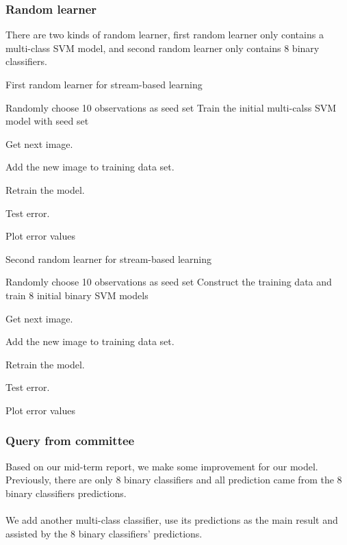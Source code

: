 \documentclass{article}
\begin{document}
\subsubsection{Random learner}
There are two kinds of random learner, first random learner only contains a multi-class SVM model, and second random learner only contains 8 binary classifiers.
\begin{algorithm}[H]
	\caption{First random learner for stream-based learning}
	\begin{algorithmic}
		\State Randomly choose 10 observations as seed set
		\State Train the initial multi-calss SVM model with seed set

			Get next image.
			
			Add the new image to training data set.
			
			Retrain the model.
			
			Test error.
		\EndFor
		
	\State Plot error values
	\end{algorithmic}
\end{algorithm}

\begin{algorithm}[H]
	\caption{Second random learner for stream-based learning}
	\begin{algorithmic}
		\State Randomly choose 10 observations as seed set
		\State Construct the training data and train 8 initial binary SVM models
		\For {$i = 1:oracle_nums$}

			Get next image.
			
			Add the new image to training data set.
			
			Retrain the model.
			
			Test error.
		\EndFor
		
	\State Plot error values
	\end{algorithmic}
\end{algorithm}
\subsubsection{Query from committee}
Based on our mid-term report, we make some improvement for our model. Previously, there are only 8 binary classifiers and all prediction came from the 8 binary classifiers predictions.
\\
\\
We add another multi-class classifier, use its predictions as the main result and assisted by the 8 binary classifiers' predictions.
\end{document}
